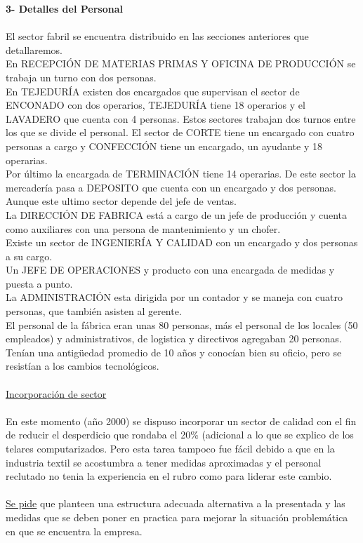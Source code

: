 \documentclass[a4paper,10pt,titlepage]{article}
\begin{document}
\newpage
	 \textbf{3- Detalles del Personal}\\ \\
			\indent El sector fabril se encuentra distribuido en las secciones anteriores que detallaremos.\\
			\indent En RECEPCIÓN DE MATERIAS PRIMAS Y OFICINA DE PRODUCCIÓN se trabaja un turno con dos personas.\\
			\indent En TEJEDURÍA existen dos encargados que supervisan el sector de ENCONADO con dos operarios, TEJEDURÍA tiene 18 operarios y el LAVADERO que cuenta con 4 personas. Estos sectores trabajan dos turnos entre los que se divide el personal. El sector de CORTE tiene un encargado con cuatro personas a cargo y CONFECCIÓN tiene un encargado, un ayudante y 18 operarias.\\ 
			\indent Por \'ultimo la encargada de TERMINACIÓN tiene 14 operarias. De este sector la mercader\'ia pasa a DEPOSITO que cuenta con un encargado y dos personas. Aunque este ultimo sector depende del jefe de ventas.\\
			\indent La DIRECCIÓN DE FABRICA est\'a a cargo de un jefe de producci\'on y cuenta como auxiliares con una persona de mantenimiento y un chofer.\\
			\indent Existe un sector de INGENIERÍA Y CALIDAD con un encargado y dos personas a su cargo.\\
			\indent Un JEFE DE OPERACIONES y producto con una encargada de medidas y puesta a punto.\\
			\indent La ADMINISTRACIÓN esta dirigida por un contador y se maneja con cuatro personas, que tambi\'en asisten al gerente.\\
			\indent El personal de la f\'abrica eran unas 80 personas, m\'as el personal de los locales (50 empleados) y administrativos, de logistica y directivos agregaban 20 personas. Ten\'ian una antigüedad promedio de 10 años y conoc\'ian bien su oficio, pero se resist\'ian a los cambios tecnol\'ogicos.\\\\
			\underline{Incorporaci\'on de sector}\\\\
			\indent En este momento (año 2000) se dispuso incorporar un sector de calidad con el fin de reducir el desperdicio que rondaba el 20\% (adicional a lo que se explico de los telares computarizados. Pero esta tarea tampoco fue f\'acil debido a que en la industria textil se acostumbra a tener medidas aproximadas y el personal reclutado no tenia la experiencia en el rubro como para liderar este cambio.\\ \\
			\indent \underline{Se pide} que planteen una estructura adecuada alternativa a la presentada y las medidas que se deben poner en practica para mejorar la situaci\'on problem\'atica en que se encuentra la empresa.\\
\end{document}
